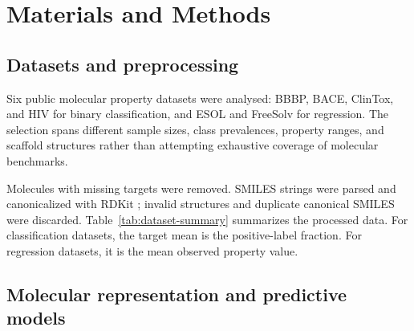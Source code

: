 \section{Materials and Methods}

\subsection{Datasets and preprocessing}

Six public molecular property datasets were analysed: BBBP, BACE, ClinTox, and HIV for binary classification, and ESOL and FreeSolv for regression. The selection spans different sample sizes, class prevalences, property ranges, and scaffold structures rather than attempting exhaustive coverage of molecular benchmarks.

Molecules with missing targets were removed. SMILES strings were parsed and canonicalized with RDKit \citep{rdkit}; invalid structures and duplicate canonical SMILES were discarded. Table~\ref{tab:dataset-summary} summarizes the processed data. For classification datasets, the target mean is the positive-label fraction. For regression datasets, it is the mean observed property value.

\begin{table}[H]
\centering
\caption{Dataset summary after preprocessing.}
\label{tab:dataset-summary}
\end{table}

\subsection{Molecular representation and predictive models}

